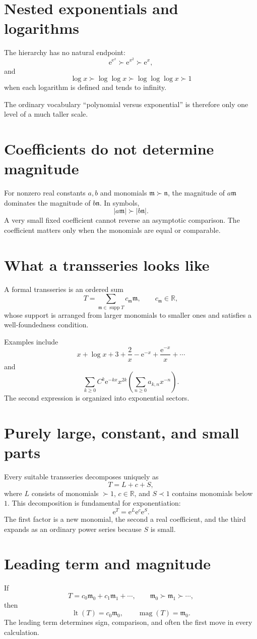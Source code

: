 \documentclass[11pt,oneside,openany]{book}
\newcommand{\R}{\mathbb{R}}
\newcommand{\supp}{\operatorname{supp}}
\newcommand{\magop}{\operatorname{mag}}
\newcommand{\e}{\mathrm{e}}
\newcommand{\mon}{\mathfrak{m}}
\newcommand{\nmon}{\mathfrak{n}}
\theoremstyle{plain}
\theoremstyle{definition}
\theoremstyle{remark}
\begin{document}
\section{Nested exponentials and logarithms}
The hierarchy has no natural endpoint:
\[
  \e^{\e^x}\succ\e^{x^2}\succ\e^x,
\]
and
\[
  \log x\succ\log\log x\succ\log\log\log x\succ1
\]
when each logarithm is defined and tends to infinity.

The ordinary vocabulary ``polynomial versus exponential'' is therefore only one level of a much taller scale.

\section{Coefficients do not determine magnitude}
For nonzero real constants $a,b$ and monomials $\mon\succ\nmon$, the magnitude of $a\mon$ dominates the magnitude of $b\nmon$. In symbols,
\[
  |a\mon|\succ |b\nmon|.
\]
A very small fixed coefficient cannot reverse an asymptotic comparison. The coefficient matters only when the monomials are equal or comparable.

\section{What a transseries looks like}
A formal transseries is an ordered sum
\[
  T=\sum_{\mon\in\supp T}c_\mon\mon,
  \qquad c_\mon\in\R,
\]
whose support is arranged from larger monomials to smaller ones and satisfies a well-foundedness condition.

Examples include
\[
  x+\log x+3+\frac{2}{x}-\e^{-x}+\frac{\e^{-x}}x+\cdots
\]
and
\[
  \sum_{k\ge0}C^k\e^{-kx}x^{2k}
  \left(\sum_{n\ge0}a_{k,n}x^{-n}\right).
\]
The second expression is organized into exponential sectors.

\section{Purely large, constant, and small parts}
Every suitable transseries decomposes uniquely as
\[
  T=L+c+S,
\]
where $L$ consists of monomials $\succ1$, $c\in\R$, and $S\prec1$ contains monomials below $1$. This decomposition is fundamental for exponentiation:
\[
  \e^T=\e^L\e^c\e^S.
\]
The first factor is a new monomial, the second a real coefficient, and the third expands as an ordinary power series because $S$ is small.

\section{Leading term and magnitude}
If
\[
  T=c_0\mon_0+c_1\mon_1+\cdots,
  \qquad\mon_0\succ\mon_1\succ\cdots,
\]
then
\[
  \operatorname{lt}(T)=c_0\mon_0,
  \qquad
  \magop(T)=\mon_0.
\]
The leading term determines sign, comparison, and often the first move in every calculation.
\end{document}
